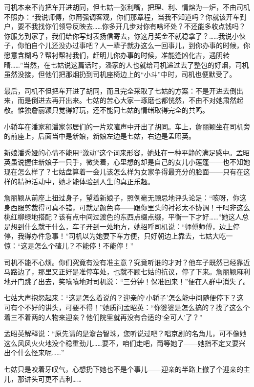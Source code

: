 \par 司机本来不肯把车开进胡同，但七姑一张利嘴，把理、利、情熔为一炉，不由司机不照办：“我说师傅，你甭强调客观，你们那章程，当我不知道吗？你就该开车到户，要不我找你们领导反映去……你多开几步对你有啥坏处？不还能多收点钱吗？你服务到家了，我们给你写封表扬信寄去，你这月奖金不就稳拿了？……我说小伙子，你怕自个儿还没办过事吧？人一辈子就办这么一回事儿，到你办事的时候，你愿意含糊吗？帮衬帮衬我们，赶明儿你办事的时候，准能逢凶化吉，遇阴转晴……”当然，在七姑说这篇话时，潘家的人也就给司机递过去了整包的好烟，司机虽然没接，但他们把那烟扔到司机座椅边上的“小斗”中时，司机也便默受了。
\par 最后，司机不但把车开进了胡同，而且完全采取了七姑的方案：不是开进去倒出来，而是倒进去再开出来。七姑的苦心大家一琢磨也都恍然，不由不对她肃然起敬。惟独詹丽颖只觉得好玩，还不能同七姑的情绪取得完全的共鸣。
\par 小轿车在潘家和潘家邻居们的一片欢喧声中开出了胡同。车上，詹丽颖坐在司机旁的前座上，后面当中是新娘，新娘左边是七姑，右边是孟昭英。
\par 新娘潘秀娅的心情不能用“激动”这个词来形容，她处在一种平静的满足感中。孟昭英虽说握住新娘子一只手，微笑着，心里想的却是自己的女儿小莲蓬——也不知她现在怎么样了？七姑盘算着一会儿该怎么样为女家争得最充分的脸面——只有在这样的精神活动中，她才能体验到人生的真正乐趣。
\par 詹丽颖从前座上扭过身子，望着新娘子，照例毫无顾忌地评头论足：“咳呀，你这身西服剪裁得可真不错，可就是颜色嘛——跟你里头的衬衫太不协调！干吗非这么桃红柳绿地搭配？该有点中间过渡色的东西点缀点缀，平衡一下才好……”她这人总是想到什么就干什么，车子开到一处地方，她招呼司机说：“师傅师傅，边上停停，我得办件急事！”司机以为她要下车方便，只好朝边上靠去，七姑大吃一惊：“这是怎么个碴儿？不能停！不能停！”
\par 司机不能不心烦。你们究竟有没有准主意？究竟听谁的才对？他车子既然已经靠近马路边了，那里又正好是准停车处，也就不顾七姑的抗议，停了下来。詹丽颖麻利地开门跳了出去，笑嘻嘻地对司机说：“三分钟！保准回来！”便在人群中消失了。
\par 七姑大声抱怨起来：“这是怎么着说的？迎亲的‘小轿子’怎么能中间随便停下？这可有个不好的讲头，可要不得！”她质问孟昭英：“你婆婆是怎么搞的？找了这么个着三不着两的人物来迎亲？他们院里就再没有合适的‘全可人’了？”
\par 孟昭英解释说：“原先请的是澹台智珠，您听说过吧？唱京剧的名角儿，可不像她这么风风火火地没个稳重劲儿……要不，咱们走吧，甭等她了——她指不定又要兴出个什么怪来呢……”
\par 七姑只是咬着牙叹气，心想扔下她也不是个事儿——迎亲的半路上撤了个迎亲的主儿，那讲头可更不吉利……
